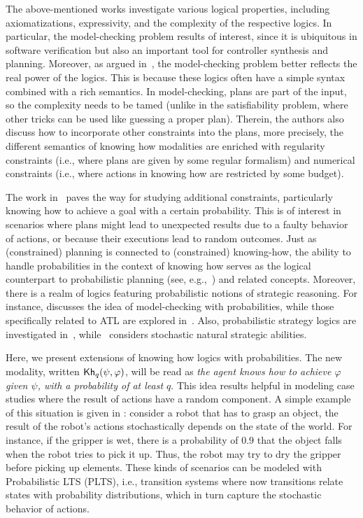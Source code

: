 The above-mentioned works investigate various logical properties, including axiomatizations, expressivity, and the complexity of the respective logics. In particular, the model-checking problem results of interest, since it is  ubiquitous in software verification but also an important tool for controller synthesis and planning. Moreover, as argued in~\cite{DF23}, the model-checking problem better reflects the real power of the logics. This is because these logics often have a simple syntax combined with a rich semantics. In model-checking, plans are part of the input, so the complexity needs to be tamed (unlike in the satisfiability problem, where other tricks can be used like guessing a proper plan). Therein,  the authors also discuss how to incorporate other constraints into the plans, more precisely, the different semantics of knowing how modalities are enriched with regularity constraints (i.e., where plans are given by some regular formalism) and numerical constraints (i.e., where actions in knowing how are restricted by some budget). 

The work in~\cite{DF23} paves the way for studying additional constraints, particularly knowing how to achieve a goal with a certain probability. This is of interest in scenarios where plans might lead to unexpected results due to a faulty behavior of actions,  or because their executions lead to random outcomes. Just as (constrained) planning is connected to (constrained) knowing-how, the ability to handle probabilities in the context of knowing how serves as the logical counterpart to probabilistic planning (see, e.g.,~\cite{MadaniHC99}) and related concepts. Moreover, there is a realm of logics featuring probabilistic notions of strategic reasoning. For instance, \cite{BaierAFK18} discusses the idea of model-checking with probabilities, while those specifically related to ATL are explored in~\cite{BA95,TJ07,BullingJ09}. Also, probabilistic strategy logics are investigated in~\cite{AKMM19}, while~\cite{BerthonKMM24} considers stochastic natural strategic abilities. %

Here, we present extensions of knowing how logics with probabilities. The new modality, written ${\mathsf{Kh}}_q(\psi,\varphi)$, will be read as \emph{the agent knows how to achieve $\varphi$ given $\psi$, with a probability of at least $q$}. This idea results helpful in modeling case studies where the result of actions have a random component. A simple example of this situation is given in \cite{Kushmerick1995}: consider a robot that has to grasp an object,  the result of the robot's actions stochastically depends on the state of the world. For instance,  if the gripper is wet,  there is  a probability of $0.9$ that the object falls when the robot tries to pick it up.  Thus,  the robot may try to dry the gripper before picking up elements.   These kinds of scenarios can be modeled with Probabilistic LTS (PLTS), i.e., transition systems where now transitions relate states with probability distributions,  which in turn  capture the stochastic behavior of actions.

